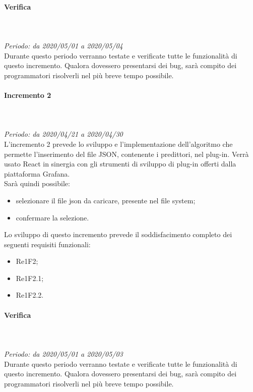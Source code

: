\paragraph*{Verifica}\mbox{} \\ \mbox{} \\ 
\textit{Periodo: da 2020/05/01 a 2020/05/04}\\
Durante questo periodo verranno testate e verificate tutte le funzionalità di questo incremento. Qualora dovessero presentarsi dei bug\glo, sarà compito dei programmatori risolverli nel più breve tempo possibile.

\paragraph{Incremento 2}\mbox{} \\ \mbox{} \\ 
\textit{Periodo: da 2020/04/21 a 2020/04/30}\\
L’incremento 2 prevede lo sviluppo e l’implementazione dell'algoritmo che permette l'inserimento del file JSON, contenente i predittori, nel plug-in. Verrà usato React in sinergia con gli strumenti di sviluppo di plug-in offerti dalla piattaforma Grafana. \\
Sarà quindi possibile:
\begin{itemize}
	\item selezionare il file json da caricare, presente nel file system;
	\item confermare la selezione.
\end{itemize}
Lo sviluppo di questo incremento prevede il soddisfacimento completo dei seguenti requisiti funzionali:
\begin{itemize}
\item Re1F2;
\item Re1F2.1;
\item Re1F2.2.
\end{itemize}
\paragraph*{Verifica}\mbox{} \\ \mbox{} \\ 
\textit{Periodo: da 2020/05/01 a 2020/05/03}\\
Durante questo periodo verranno testate e verificate tutte le funzionalità di questo incremento. Qualora dovessero presentarsi dei bug, sarà compito dei programmatori risolverli nel più breve tempo possibile.

